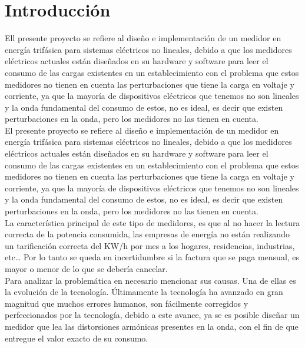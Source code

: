 \setcounter{page}{1}


\newpage{\cleardoublepage}
\chapter{Introducción}

Ell presente proyecto se refiere al diseño e implementación de un medidor en energía trifásica para sistemas eléctricos no lineales, debido a que los medidores eléctricos actuales están diseñados en su hardware y software para leer el consumo de las cargas existentes en un establecimiento con el problema que estos medidores no tienen en cuenta las perturbaciones que tiene la carga en voltaje y corriente, ya que la mayoría de dispositivos eléctricos que tenemos no son lineales y la onda fundamental del consumo de estos, no es ideal, es decir que existen perturbaciones en la onda, pero los medidores no las tienen en cuenta.\\



El presente proyecto se refiere al diseño e implementación de un medidor en energía trifásica para sistemas eléctricos no lineales, debido a que los medidores eléctricos actuales están diseñados en su hardware y software para leer el consumo de las cargas existentes en un establecimiento con el problema que estos medidores no tienen en cuenta las perturbaciones que tiene la carga en voltaje y corriente, ya que la mayoría de dispositivos eléctricos que tenemos no son lineales y la onda fundamental del consumo de estos, no es ideal, es decir que existen perturbaciones en la onda, pero los medidores no las tienen en cuenta. \\

La característica principal de este tipo de medidores, es que al no hacer la lectura correcta de la potencia consumida, las empresas de energía no están realizando un tarificación correcta del KW/h por mes a los hogares, residencias, industrias, etc… Por lo tanto se queda en incertidumbre si la factura que se paga mensual, es mayor o menor de lo que se debería cancelar.\\

Para analizar la problemática en necesario mencionar sus causas. Una de ellas es la evolución de la tecnología. Últimamente la tecnología ha avanzado en gran magnitud que muchos errores humanos, son fácilmente corregidos y perfeccionados por la tecnología, debido a este avance, ya se es posible diseñar un medidor que lea las distorsiones armónicas presentes en la onda, con el fin de que entregue el valor exacto de su consumo.\\

